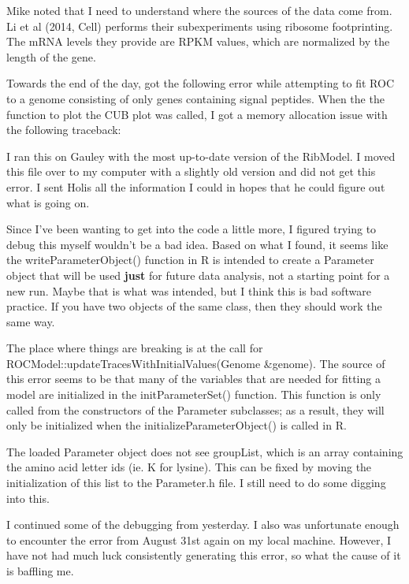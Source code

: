 \documentclass[11pt]{labbook}
\begin{document}
Mike noted that I need to understand where the sources of the data come from. Li et al (2014, Cell) performs their subexperiments using ribosome footprinting. The mRNA levels they provide are RPKM values, which are normalized by the length of the gene. 


Towards the end of the day, got the following error while attempting to fit ROC to a genome consisting of only genes containing signal peptides. When the the function to plot the CUB plot was called, I got a memory allocation issue with the following traceback:


I ran this on Gauley with the most up-to-date version of the RibModel. I moved this file over to my computer with a slightly old version and did not get this error. I sent Holis all the information I could in hopes that he could figure out what is going on.


Since I've been wanting to get into the code a little more, I figured trying to debug this myself wouldn't be a bad idea. Based on what I found, it seems like the writeParameterObject() function in R is intended to create a Parameter object that will be used \textbf{just} for future data analysis, not a starting point for a new run. Maybe that is what was intended, but I think this is bad software practice. If you have two objects of the same class, then they should work the same way.

The place where things are breaking is at the call for ROCModel::updateTracesWithInitialValues(Genome \&genome). The source of this error seems to be that many of the variables that are needed for fitting a model are initialized in the initParameterSet() function. This function is only called from the constructors of the Parameter subclasses; as a result, they will only be initialized when the initializeParameterObject() is called in R. 

The loaded Parameter object does not see groupList, which is an array containing the amino acid letter ids (ie. K for lysine). This can be fixed by moving the initialization of this list to the Parameter.h file. I still need to do some digging into this.

I continued some of the debugging from yesterday. I also was unfortunate enough to encounter the error from August 31st again on my local machine. However, I have not had much luck consistently generating this error, so what the cause of it is baffling me. 
\end{document}
